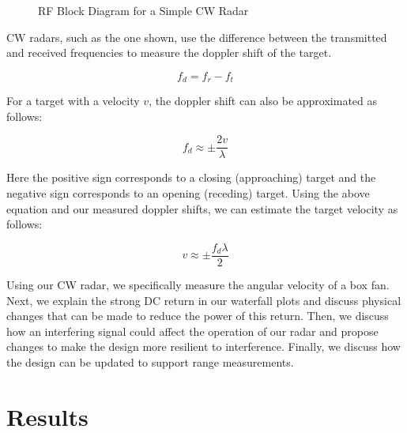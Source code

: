 \documentclass{article}
\begin{document}
\begin{figure}[H]
    	\centering
    	\caption{RF Block Diagram for a Simple CW Radar \cite{charvat_2011_build}}
    	\label{fig::cw_radar_block_diagram}
\end{figure}

\noindent CW radars, such as the one shown, use the difference between the transmitted and received frequencies to measure the doppler shift of the target.

\begin{equation*}
	f_d = f_r - f_t
\end{equation*}

\noindent For a target with a velocity $v$, the doppler shift can also be approximated as follows:

\begin{equation*}
	\label{eq::dopp_shift}
	f_d \approx \pm\frac{2v}{\lambda}
\end{equation*}

\noindent Here the positive sign corresponds to a closing (approaching) target and the negative sign corresponds to an opening (receding) target. Using the above equation and our measured doppler shifts, we can estimate the target velocity as follows:

\begin{equation*}
	v \approx \pm\frac{f_d\lambda}{2}
\end{equation*}

\noindent Using our CW radar, we specifically measure the angular velocity of a box fan. Next, we explain the strong DC return in our waterfall plots and discuss physical changes that can be made to reduce the power of this return. Then, we discuss how an interfering signal could affect the operation of our radar and propose changes to make the design more resilient to interference. Finally, we discuss how the design can be updated to support range measurements.

\section{Results}
\end{document}
